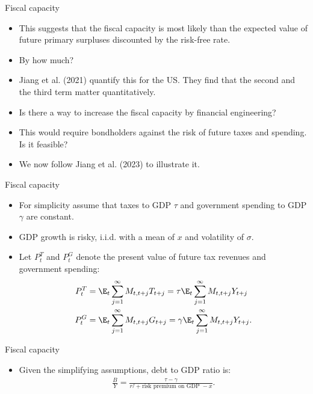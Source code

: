 \documentclass[11pt,xcolor={dvipsnames},aspectratio=159,hyperref={pdftex,pdfpagemode=UseNone,hidelinks,pdfdisplaydoctitle=true},usepdftitle=false]{beamer}
\begin{document}
\begin{frame}{Fiscal capacity}  
    \begin{itemize}
        \item This suggests that the fiscal capacity is most likely  than the expected value of future primary surpluses discounted by the risk-free rate.
        \item By how much?
        \item Jiang et al. (2021) quantify this for the US. They find that the second and the third term matter quantitatively. 
        \item Is there a way to increase the fiscal capacity by financial engineering?
        \item This would require  bondholders against the risk of future taxes and spending. Is it feasible?
        \item We now follow Jiang et al. (2023) to illustrate it.
     \end{itemize}
\end{frame}

\begin{frame}{Fiscal capacity}  
    \begin{itemize}
        \item For simplicity assume that taxes to GDP $\tau$ and government spending to GDP $\gamma$ are constant.
        \item GDP growth is risky, i.i.d. with a mean of $x$ and volatility of $\sigma$.
        \item Let $P^T_t$ and $P^G_t$ denote the present value of future tax revenues and government spending:
        \begin{align*}
            P^T_t & = \E_t \sum_{j=1}^\infty M_{t,t+j} T_{t+j} = \tau \E_t \sum_{j=1}^\infty M_{t,t+j} Y_{t+j}\\
            P^G_t & = \E_t \sum_{j=1}^\infty M_{t,t+j} G_{t+j} = \gamma \E_t \sum_{j=1}^\infty M_{t,t+j} Y_{t+j}.
        \end{align*}
     \end{itemize}
\end{frame}

\begin{frame}{Fiscal capacity}  
    \begin{itemize}
        \item Given the simplifying assumptions, debt to GDP ratio is: \begin{align*}
            \frac{B}{Y} = \frac{\tau-\gamma}{r^f + \text{risk premium on GDP } - x}.
        \end{align*}
     \end{itemize}
\end{frame}
\end{document}

